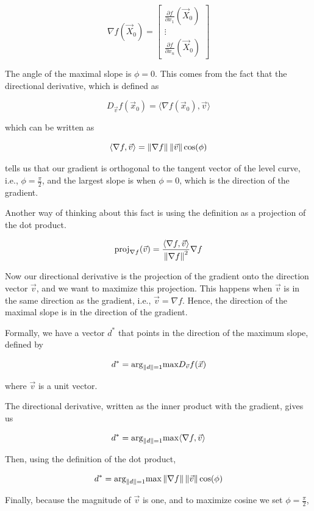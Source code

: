 \[
    \nabla f(\vec{X}_0) = \begin{bmatrix}
    \frac{\partial f}{\partial x_1}(\vec{X}_0) \\
    \vdots \\
    \frac{\partial f}{\partial x_n}(\vec{X}_0)
    \end{bmatrix}
\]

The angle of the maximal slope is \(\phi = 0\). This comes from the fact that 
the directional derivative, which is defined as

\[
    D_{\vec{v}}f(\vec{x}_0) = \langle \nabla f(\vec{x}_0), \vec{v} \rangle
\]

which can be written as

\[
    \langle \nabla f, \vec{v}\rangle = \left\| \nabla f \right\| \left\| \vec{v} \right\| \cos(\phi)
\]

tells us that our gradient is orthogonal to the tangent vector of the level curve, i.e., \(\phi = \frac{\pi}{2}\), and 
the largest slope is when \(\phi = 0\), which is the direction of the gradient.

Another way of thinking about this fact is using the definition as a projection of the dot product. 

\[
    \mathrm{proj}_{\nabla f} (\vec{v}) = \frac{\langle \nabla f, \vec{v}\rangle}{\left\| \nabla f \right\|^2} \nabla f
\]

Now our directional derivative is the projection of the gradient onto the direction vector \(\vec{v}\), and we want to maximize this projection.
This happens when \(\vec{v}\) is in the same direction as the gradient, i.e., \(\vec{v} = \nabla f\). Hence, the direction of the maximal slope is 
in the direction of the gradient.

Formally, we have a vector \(d^*\) that points in the direction of the maximum slope, defined by

\[
    d^* = \text{arg}_{\left\| d \right\| = 1} \text{max} D_{\vec{v}}f(\vec{x})
\]

where \(\vec{v}\) is a unit vector. 

The directional derivative, written as the inner product with the gradient, gives us

\[
    d^* = \text{arg}_{\left\| d \right\| = 1} \text{max} \langle \nabla f, \vec{v} \rangle 
\]

Then, using the definition of the dot product,

\[
    d^* = \text{arg}_{\left\| d \right\| = 1} \text{max} \left\| \nabla f \right\| \left\| \vec{v} \right\| \cos(\phi) 
\]

Finally, because the magnitude of \(\vec{v}\) is one, and to maximize cosine we set \(\phi = \frac{\pi}{2}\),

